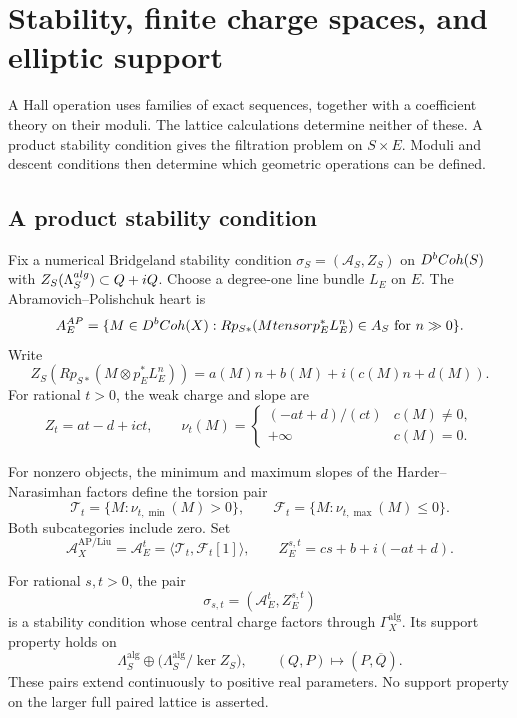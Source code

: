 \section{Stability, finite charge spaces, and elliptic support}
\label{app:stability-support}

A Hall operation uses families of exact sequences, together with a
coefficient theory on their moduli.  The lattice calculations determine
neither of these.  A product stability condition gives the filtration problem on
$S\times E$.  Moduli and descent conditions then determine which
geometric operations can be defined.

\subsection{A product stability condition}

\begin{definition}
\label{def:liu-product-stability-datum}
\label{def:retained-ap-liu-heart}
Fix a numerical Bridgeland stability condition
$\sigma_S=(\mathcal A_S,Z_S)$ on $D^bCoh(S)$ with
$Z_S(\Lambda_S^{alg})\subset Q+iQ$.
Choose a degree-one line bundle $L_E$ on $E$.  The
Abramovich--Polishchuk heart \cite{AbramovichPolishchukTStructures} is
\[
A_E^{AP}=
\{M\in D^bCoh(X):Rp_{S*}(Mtensor p_E^*L_E^n)\in A_S
\text{ for }n\gg0\}.
\]
Write
\[
Z_S(Rp_{S*}(M\otimes p_E^*L_E^n))
=a(M)n+b(M)+i(c(M)n+d(M)).
\]
For rational $t>0$, the weak charge and slope are
\[
Z_t=at-d+ict,
\qquad
\nu_t(M)=\begin{cases}(-at+d)/(ct)&c(M)\ne0,\\
 +\infty&c(M)=0.\end{cases}
\]

For nonzero objects, the minimum and maximum slopes of the
Harder--Narasimhan factors define the torsion pair
\[
\mathcal T_t=\{M:\nu_{t,\min}(M)>0\},
\qquad \mathcal F_t=\{M:\nu_{t,\max}(M)\le0\}.
\]
Both subcategories include zero.  Set
\[
\mathcal A_X^{\mathrm{AP/Liu}}
=\mathcal A_E^t=\langle\mathcal T_t,\mathcal F_t[1]\rangle,
\qquad Z_E^{s,t}=cs+b+i(-at+d).
\]
\end{definition}

\begin{proposition}
\label{prop:ap-liu-heart-compatibility}
For rational $s,t>0$, the pair
\[
\sigma_{s,t}=(\mathcal A_E^t,Z_E^{s,t})
\]
is a stability condition whose central charge factors through
$\Gamma_X^{\mathrm{alg}}$.  Its support property holds on
\[
\Lambda_S^{\mathrm{alg}}\oplus
\bigl(\Lambda_S^{\mathrm{alg}}/\ker Z_S\bigr),
\qquad (Q,P)\longmapsto(P,\overline Q).
\]
These pairs extend continuously to positive real parameters.
No support property on the larger full paired lattice is asserted.
\end{proposition}

